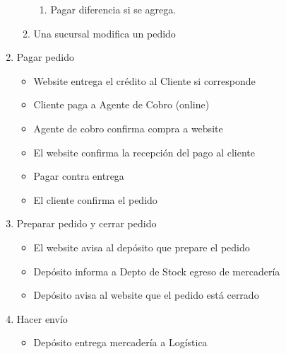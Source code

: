 \begin{enumerate}
\begin{enumerate}
\begin{enumerate}
      \item Pagar diferencia si se agrega.

    \end{enumerate}

    \item Una sucursal modifica un pedido

  \end{enumerate}

  \item Pagar pedido

  \begin{itemize}

    \item Website entrega el crédito al Cliente si corresponde

    \item Cliente paga a Agente de Cobro (online)

    \item Agente de cobro confirma compra a website

    \item El website confirma la recepción del pago al cliente

    \item Pagar contra entrega

    \item El cliente confirma el pedido

  \end{itemize}

  \item Preparar pedido y cerrar pedido

  \begin{itemize}

    \item El website avisa al depósito que prepare el pedido

    \item Depósito informa a Depto de Stock egreso de mercadería

    \item Depósito avisa al website que el pedido está cerrado

  \end{itemize}

  \item Hacer envío

  \begin{itemize}

    \item Depósito entrega mercadería a Logística


\end{itemize}
\end{enumerate}
